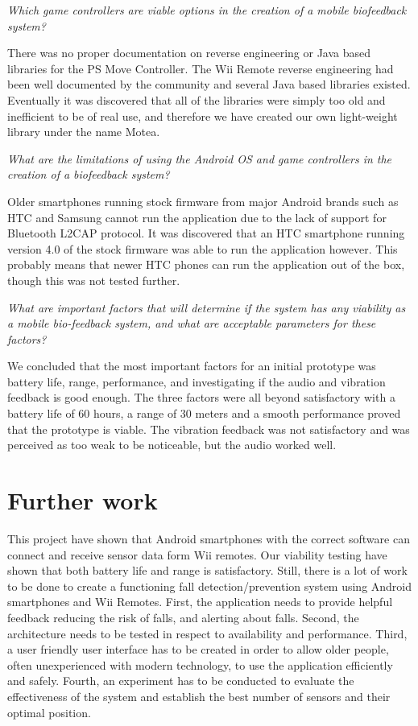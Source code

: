 \textit{Which game controllers are viable options in the creation of a mobile biofeedback system?}


There was no proper documentation on reverse engineering or Java based libraries for the PS Move Controller. The Wii Remote reverse engineering had been well documented by the community and several Java based libraries existed. Eventually it was discovered that all of the libraries were simply too old and inefficient to be of real use, and therefore we have created our own light-weight library under the name Motea.

\textit{What are the limitations of using the Android OS and game controllers in the creation of a biofeedback system?}


Older smartphones running stock firmware from major Android brands such as HTC and Samsung cannot run the application due to the lack of support for Bluetooth L2CAP protocol. It was discovered that an HTC smartphone running version 4.0 of the stock firmware was able to run the application however. This probably means that newer HTC phones can run the application out of the box, though this was not tested further.


\textit{What are important factors that will determine if the system has any viability as a mobile bio-feedback system, and what are acceptable parameters for these factors?}


We concluded that the most important factors for an initial prototype was battery life, range, performance, and investigating if the audio and vibration feedback is good enough. The three factors were all beyond satisfactory with a battery life of 60 hours, a range of 30 meters and a smooth performance proved that the prototype is viable. The vibration feedback was not satisfactory and was perceived as too weak to be noticeable, but the audio worked well.

\section{Further work}
This project have shown that Android smartphones with the correct software can connect and receive sensor data form Wii remotes. Our viability testing have shown that both battery life and range is satisfactory. Still, there is a lot of work to be done to create a functioning fall detection/prevention system using Android smartphones and Wii Remotes. First, the application needs to provide helpful feedback reducing the risk of falls, and alerting about falls. Second, the architecture needs to be tested in respect to availability and performance. Third, a user friendly user interface has to be created in order to allow older people, often unexperienced with modern technology, to use the application efficiently and safely. Fourth, an experiment has to be conducted to evaluate the effectiveness of the system and establish the best number of sensors and their optimal position.
\begin{comment}
+ Only an initial prototype
+ Optimization
+ Create proper algorithms for the threshold, and tweak sensor values
+ A more user friendly interface
+ Experiment with multiple controllers or different sensors ?
\end{comment}